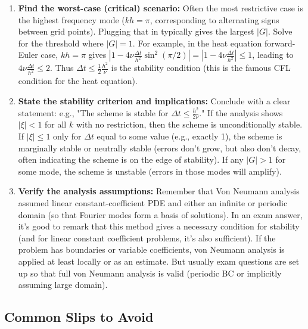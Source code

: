 \documentclass[a4paper,11pt]{article}
\begin{document}
\begin{enumerate}
    \item \textbf{Find the worst-case (critical) scenario:} Often the most restrictive case is the highest frequency mode ($kh = \pi$, corresponding to alternating signs between grid points). Plugging that in typically gives the largest $|G|$. Solve for the threshold where $|G|=1$. For example, in the heat equation forward-Euler case, $kh = \pi$ gives $|1 - 4\nu \frac{\Delta t}{h^2}\sin^2(\pi/2)| = |1 - 4\nu \frac{\Delta t}{h^2}| \le 1$, leading to $4\nu \frac{\Delta t}{h^2} \le 2$. Thus $\Delta t \le \frac{1}{2}\frac{h^2}{\nu}$ is the stability condition (this is the famous CFL condition for the heat equation).

    \item \textbf{State the stability criterion and implications:} Conclude with a clear statement: e.g., "The scheme is stable for $\displaystyle \Delta t \le \frac{h^2}{2\nu}$." If the analysis shows $|\xi| < 1$ for all $k$ with no restriction, then the scheme is unconditionally stable. If $|\xi|\le 1$ only for $\Delta t$ equal to some value (e.g., exactly 1), the scheme is marginally stable or neutrally stable (errors don't grow, but also don't decay, often indicating the scheme is on the edge of stability). If any $|G|>1$ for some mode, the scheme is unstable (errors in those modes will amplify).

    \item \textbf{Verify the analysis assumptions:} Remember that Von Neumann analysis assumed linear constant-coefficient PDE and either an infinite or periodic domain (so that Fourier modes form a basis of solutions). In an exam answer, it's good to remark that this method gives a necessary condition for stability (and for linear constant coefficient problems, it's also sufficient). If the problem has boundaries or variable coefficients, von Neumann analysis is applied at least locally or as an estimate. But usually exam questions are set up so that full von Neumann analysis is valid (periodic BC or implicitly assuming large domain).
\end{enumerate}

\subsection{Common Slips to Avoid}
\end{document}
